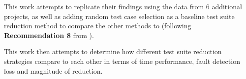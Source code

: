 This work attempts to replicate their findings using the data from 6
additional projects, as well as adding random test case selection as
a baseline test suite reduction method to compare the other methods to
(following \textbf{Recommendation 8} from \cite{khan2018systematic}).

This work then attempts to determine how different test suite reduction
strategies compare to each other in terms of time performance, fault
detection loss and magnitude of reduction.

%
%
%
%
%
%
%
